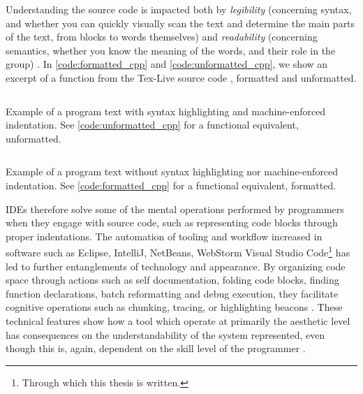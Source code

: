 Understanding the source code is impacted both by \emph{legibility} (concerning syntax, and whether you can quickly visually scan the text and determine the main parts of the text, from blocks to words themselves) and \emph{readability} (concerning semantics, whether you know the meaning of the words, and their role in the group) \citep{oliveira_evaluating_2020,jacques_understanding_2015}. In \ref{code:formatted_cpp} and \ref{code:unformatted_cpp}, we show an excerpt of a function from the Tex-Live source code \citep{berry_texlive_2022}, formatted and unformatted.

\begin{listing}
    \inputminted{cpp}{./corpus/formatted.cpp}
    \caption{Example of a program text with syntax highlighting and machine-enforced indentation. See \ref{code:unformatted_cpp} for a functional equivalent, unformatted.}
    \label{code:formatted_cpp}
\end{listing}

\begin{listing}
    \inputminted{text}{./corpus/unformatted.cpp}
    \caption{Example of a program text without syntax highlighting nor machine-enforced indentation. See \ref{code:formatted_cpp} for a functional equivalent, formatted.}
    \label{code:unformatted_cpp}
\end{listing}

IDEs therefore solve some of the mental operations performed by programmers when they engage with source code, such as representing code blocks through proper indentations. The automation of tooling and workflow increased in software such as Eclipse, IntelliJ, NetBeans, WebStorm Visual Studio Code\footnote{Through which this thesis is written.} has led to further entanglements of technology and appearance. By organizing code space through actions such as self documentation, folding code blocks, finding function declarations, batch reformatting and debug execution, they facilitate cognitive operations such as chunking, tracing, or highlighting beacons \citep{bragdon_code_2010}. These technical features show how a tool which operate at primarily the aesthetic level has consequences on the understandability of the system represented, even though this is, again, dependent on the skill level of the programmer \citep{kulkarni_supporting_2017}.

